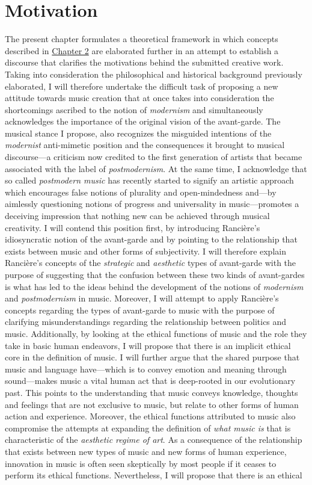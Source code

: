 \hypertarget{chapter3}{}
\chapter{Motivation}

The present chapter formulates a theoretical framework in which concepts described in \hyperlink{chapter2}{Chapter 2} are elaborated further in an attempt to establish a discourse that clarifies the motivations behind the submitted creative work. Taking into consideration the philosophical and historical background previously elaborated, I will therefore undertake the difficult task of proposing a new attitude towards music creation that at once takes into consideration the shortcomings ascribed to the notion of \emph{modernism} and simultaneously acknowledges the importance of the original vision of the avant-garde. The musical stance I propose, also recognizes the misguided intentions of the \emph{modernist} anti-mimetic position and the consequences it brought to musical discourse---a criticism now credited to the first generation of artists that became associated with the label of \emph{postmodernism}. At the same time, I acknowledge that so called \emph{postmodern music} has recently started to signify an artistic approach which encourages false notions of plurality and open-mindedness and---by aimlessly questioning notions of progress and universality in music---promotes a deceiving impression that nothing new can be achieved through musical creativity. I will contend this position first, by introducing Ranci\`{e}re's idiosyncratic notion of the avant-garde and by pointing to the relationship that exists between music and other forms of subjectivity. I will therefore explain Ranci\`{e}re's concepts of the \emph{strategic} and \emph{aesthetic} types of avant-garde with the purpose of suggesting that the confusion between these two kinds of avant-gardes is what has led to the ideas behind the development of the notions of \emph{modernism} and \emph{postmodernism} in music. Moreover, I will attempt to apply Ranci\`{e}re's concepts regarding the types of avant-garde to music with the purpose of clarifying misunderstandings regarding the relationship between politics and music. Additionally,  by looking at the ethical functions of music and the role they take in basic human endeavors, I will propose that there is an implicit ethical core in the definition of music. I will further argue that the shared purpose that music and language have---which is to convey emotion and meaning through sound---makes music a vital human act that is deep-rooted in our evolutionary past. This points to the understanding that music conveys knowledge, thoughts and feelings that are not exclusive to music, but relate to other forms of human action and experience. Moreover, the ethical functions attributed to music also compromise the attempts at expanding the definition of \emph{what music is} that is characteristic of the \emph{aesthetic regime of art}. As a consequence of the relationship that exists between new types of music and new forms of human experience, innovation in music is often seen skeptically by most people if it ceases to perform its ethical functions. Nevertheless, I will propose that there is an ethical 